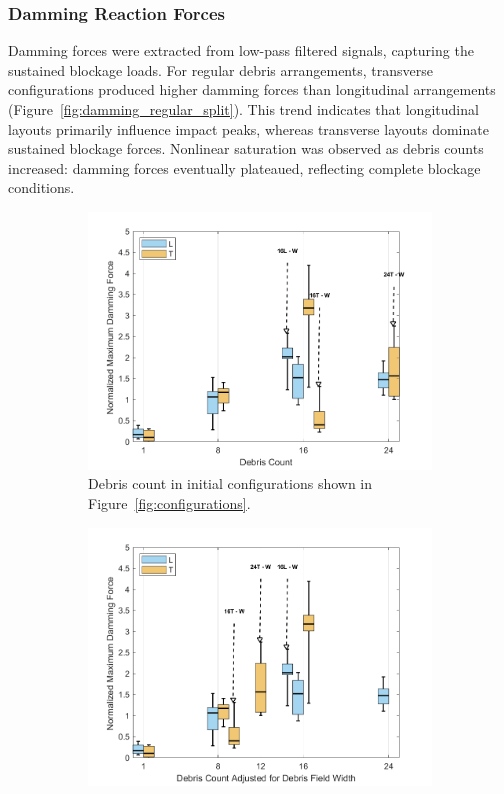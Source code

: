 \documentclass{article}
\begin{document}
{\subsubsection{Damming Reaction Forces} 
Damming forces were extracted from low-pass filtered signals, capturing the sustained blockage loads. For regular debris arrangements, transverse configurations produced higher damming forces than longitudinal arrangements  (Figure~\ref{fig:damming_regular_split}). This trend indicates that longitudinal layouts primarily influence impact peaks, whereas transverse layouts dominate sustained blockage forces. Nonlinear saturation was observed as debris counts increased: damming forces eventually plateaued, reflecting complete blockage conditions.

\begin{figure}[htbp]
    \centering
    \begin{subfigure}[t]{0.9\textwidth}
        \centering
        \includegraphics[width=\textwidth]{Damming_Regular_SplitByTrial.png}
        \caption{Debris count in initial configurations shown in Figure~\ref{fig:configurations}.}
        \label{fig:damming_regular_original}
    \end{subfigure}
    \hfill
    \begin{subfigure}[t]{0.9\textwidth}
        \centering
        \includegraphics[width=\textwidth]{Damming_Regular_L_T_SplitByTrial_Remapped.png}

\end{subfigure}
\end{figure}}
\end{document}
